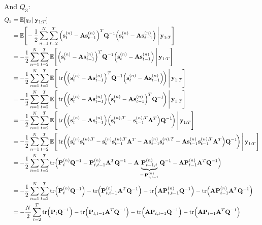 	And \(Q_3\):
	\begin{align*}
		Q_3
			&= \E[q_3 \given \vec{y}_{1:T}] \\
			&= \E\Bigg[\! -\frac{1}{2} \sum_{n = 1}^{N} \sum_{t = 2}^{T} \Big( \vec{s}_t^{(n)} - \mat{A} \vec{s}_{t - 1}^{(n)} \Big)^T \mat{Q}^{-1} \Big( \vec{s}_t^{(n)} - \mat{A} \vec{s}_{t - 1}^{(n)} \Big) \Bigggiven \vec{y}_{1:T} \Bigg] \\
			&= -\frac{1}{2} \sum_{n = 1}^{N} \sum_{t = 2}^{T} \E\Bigg[ \Big( \vec{s}_t^{(n)} - \mat{A} \vec{s}_{t - 1}^{(n)} \Big)^T \mat{Q}^{-1} \Big( \vec{s}_t^{(n)} - \mat{A} \vec{s}_{t - 1}^{(n)} \Big) \Bigggiven \vec{y}_{1:T} \Bigg] \\
			&= -\frac{1}{2} \sum_{n = 1}^{N} \sum_{t = 2}^{T} \E\Bigg[ \tr\!\bigg(\!\Big( \vec{s}_t^{(n)} - \mat{A} \vec{s}_{t - 1}^{(n)} \Big)^T \mat{Q}^{-1} \Big( \vec{s}_t^{(n)} - \mat{A} \vec{s}_{t - 1}^{(n)} \Big)\!\bigg) \Bigggiven \vec{y}_{1:T} \Bigg] \\
			&= -\frac{1}{2} \sum_{n = 1}^{N} \sum_{t = 2}^{T} \E\Bigg[ \tr\!\bigg(\!\Big( \vec{s}_t^{(n)} - \mat{A} \vec{s}_{t - 1}^{(n)} \Big) \Big( \vec{s}_t^{(n)} - \mat{A} \vec{s}_{t - 1}^{(n)} \Big)^T \mat{Q}^{-1} \!\bigg) \Bigggiven \vec{y}_{1:T} \Bigg] \\
			&= -\frac{1}{2} \sum_{n = 1}^{N} \sum_{t = 2}^{T} \E\Bigg[ \tr\!\bigg(\!\Big( \vec{s}_t^{(n)} - \mat{A} \vec{s}_{t - 1}^{(n)} \Big) \Big(\vec{s}_t^{(n), T} - \vec{s}_{t - 1}^{(n), T} \mat{A}^T \Big) \mat{Q}^{-1} \!\bigg) \Bigggiven \vec{y}_{1:T} \Bigg] \\
			&= -\frac{1}{2} \sum_{n = 1}^{N} \sum_{t = 2}^{T} \E\Bigg[ \tr\!\bigg(\!\Big( \vec{s}_t^{(n)} \vec{s}_t^{(n), T} - \vec{s}_t^{(n)} \vec{s}_{t - 1}^{(n), T} \mat{A}^T - \mat{A} \vec{s}_{t - 1}^{(n)} \vec{s}_t^{(n), T} - \mat{A} \vec{s}_{t - 1}^{(n)} \vec{s}_{t - 1}^{(n), T} \mat{A}^T \Big) \mat{Q}^{-1} \!\bigg) \Bigggiven \vec{y}_{1:T} \Bigg] \\
			&= -\frac{1}{2} \sum_{n = 1}^{N} \sum_{t = 2}^{T} \tr\!\Big( \mat{P}_t^{(n)} \mat{Q}^{-1} - \mat{P}_{t, t - 1}^{(n)} \mat{A}^T \mat{Q}^{-1} - \mat{A} \underbrace{\mat{P}_{t - 1, t}^{(n)}}_{=\, \mat{P}_{t, t - 1}^{(n)}} \mat{Q}^{-1} - \mat{A} \mat{P}_{t - 1}^{(n)} \mat{A}^T \mat{Q}^{-1} \Big) \\
			&= -\frac{1}{2} \sum_{n = 1}^{N} \sum_{t = 2}^{T} \tr\!\Big( \mat{P}_t^{(n)} \mat{Q}^{-1} \Big) - \tr\!\Big( \mat{P}_{t, t - 1}^{(n)} \mat{A}^T \mat{Q}^{-1} \Big) - \tr\!\Big( \mat{A} \mat{P}_{t, t - 1}^{(n)} \mat{Q}^{-1} \Big) - \tr\!\Big( \mat{A} \mat{P}_{t - 1}^{(n)} \mat{A}^T \mat{Q}^{-1} \Big) \\
			&= -\frac{N}{2} \sum_{t = 2}^{T} \tr\!\Big( \mat{P}_t \mat{Q}^{-1} \Big) - \tr\!\Big( \mat{P}_{t, t - 1} \mat{A}^T \mat{Q}^{-1} \Big) - \tr\!\Big( \mat{A} \mat{P}_{t, t - 1} \mat{Q}^{-1} \Big) - \tr\!\Big( \mat{A} \mat{P}_{t - 1} \mat{A}^T \mat{Q}^{-1} \Big)
	\end{align*}
